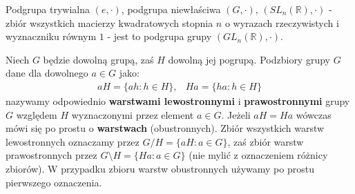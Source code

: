 \begin{przyk}
Podgrupa trywialna $(e,\cdot)$, podgrupa niewłaściwa $(G,\cdot)$, $(SL_n(\mathbb{R}),\cdot)$ - zbiór wszystkich macierzy kwadratowych stopnia $n$ o wyrazach rzeczywistych i wyznaczniku równym $1$ - jest to podgrupa grupy $(GL_n(\mathbb{R}),\cdot)$.
\end{przyk}

\begin{df}
Niech $G$ będzie dowolną grupą, zaś $H$ dowolną jej pogrupą. Podzbiory grupy $G$ dane dla dowolnego $a\in G$ jako:
$$\begin{array}{ll}
aH=\{ah:h\in H\}, & Ha=\{ha:h\in H\}
\end{array}$$
nazywamy odpowiednio \textbf{warstwami lewostronnymi} i \textbf{prawostronnymi} grupy $G$ względem $H$ wyznaczonymi przez element $a\in G$. Jeżeli $aH=Ha$ wówczas mówi się po prostu o \textbf{warstwach} (obustronnych). Zbiór wszystkich warstw lewostronnych oznaczamy przez $G/H=\{aH:a\in G\}$, zaś zbiór warstw prawostronnych przez $G\setminus H=\{Ha:a\in G\}$ (nie mylić z oznaczeniem różnicy zbiorów). W przypadku zbioru warstw obustronnych używamy po prostu pierwszego oznaczenia.
\end{df}

